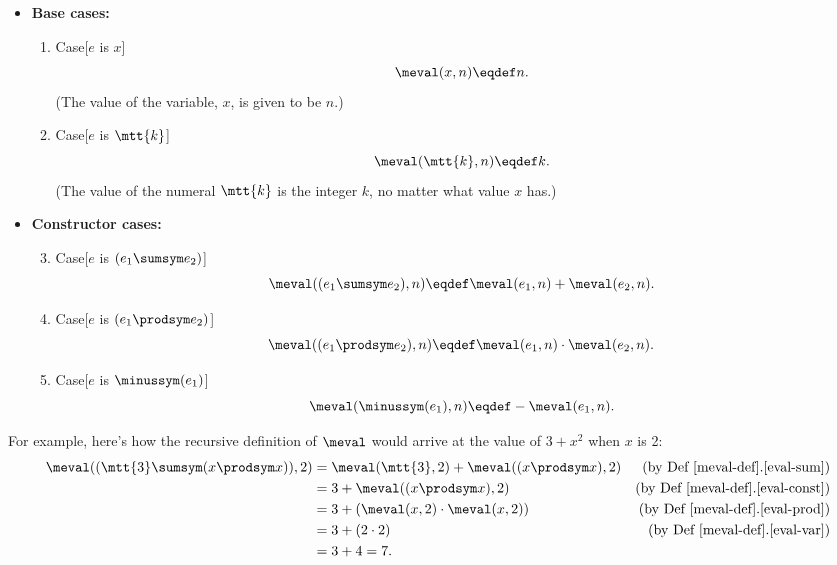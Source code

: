 \begin{definition}
\begin{definition}
\begin{itemize}
\item \textbf{Base cases:}

\begin{enumerate}

\item\label{eval-var} Case[$e$ is $x$]
\[
\meval(x, n) \eqdef n.
\]
(The value of the variable, $x$, is given to be $n$.)

\item\label{eval-const} Case[$e$ is $\mtt{k}$]
\[
\meval(\mtt{k}, n) \eqdef k.
\]
(The value of the numeral $\mtt{k}$ is the integer $k$, no matter what
value $x$ has.)

\end{enumerate}

\item \textbf{Constructor cases:}

\begin{enumerate}
\setcounter{enumi}{2}

\item\label{eval-sum} Case[$e$ is $(e_1 \sumsym e_2)$]
\[
\meval((e_1 \sumsym e_2),n) \eqdef
  \meval(e_1,n)+\meval(e_2,n).
\]

\item\label{eval-prod} Case[$e$ is $(e_1 \prodsym e_2)$]
\[
\meval((e_1 \prodsym e_2),n) \eqdef \meval(e_1,n) \cdot \meval(e_2,n).
\]

\item\label{eval-minus} Case[$e$ is $\minussym(e_1)$]
\[
\meval(\minussym(e_1),n) \eqdef - \meval(e_1,n).
\]
\end{enumerate}

\end{itemize}

\end{definition}

For example, here's how the recursive definition of $\meval$ would arrive at
the value of $3+x^2$ when $x$ is 2:
\begin{align*}
\meval((\mtt{3} \sumsym (x \prodsym x)),2)
 & = \meval(\mtt{3},2) + \meval((x \prodsym x),2)
                  & \text{(by~Def~\ref{meval-def}.\ref{eval-sum})}\\
 & = 3 + \meval((x \prodsym x),2) & \text{(by~Def~\ref{meval-def}.\ref{eval-const})}\\
 & = 3 + (\meval(x,2) \cdot \meval(x,2)) & \text{(by~Def~\ref{meval-def}.\ref{eval-prod})}\\
 & = 3 + (2 \cdot 2) & \text{(by~Def~\ref{meval-def}.\ref{eval-var})}\\
 & = 3 + 4 = 7.
\end{align*}


\end{definition}
